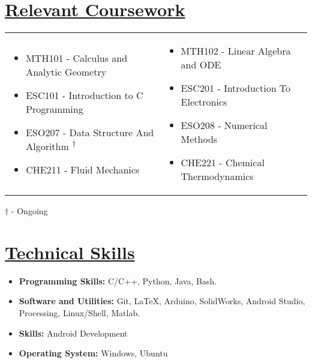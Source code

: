 \documentclass{article}
\begin{document}
\section*{\underline{Relevant Coursework}}

\begin{center}
\begin{tabular}{m{7.5cm}  m{7.5cm}}
 \begin{itemize}
\item MTH101 - Calculus and Analytic Geometry
\item ESC101 - Introduction to C Programming
\item ESO207 - Data Structure And Algorithm \textsuperscript{$\dagger$}
\item CHE211 - Fluid Mechanics

\end{itemize}
&
\begin{itemize}
\item MTH102 - Linear Algebra and ODE
\item ESC201 - Introduction To Electronics
\item ESO208 - Numerical Methods
\item CHE221 - Chemical Thermodynamics

\end{itemize}
\end{tabular}

\begin{flushright}
    
    \small{$\dagger$ - Ongoing}
\end{flushright}
\end{center}


\section*{\underline{Technical Skills}}
\begin{itemize}
\item \textbf{Programming Skills: } C/C++, Python, Java, Bash. 
\item \textbf{Software and Utilities: } Git, \LaTeX, Arduino, SolidWorks, Android Studio, Processing, Linux/Shell, Matlab.
\item \textbf{Skills: } Android Development
\item \textbf{Operating System: } Windows, Ubuntu  
\end{itemize}
\end{document}
